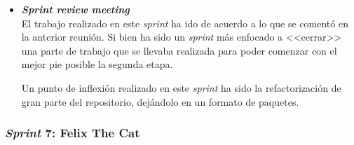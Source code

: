 \begin{itemize}
\item \textbf{\textit{Sprint review meeting}}\\
El trabajo realizado en este \textit{sprint} ha ido de acuerdo a lo que se comentó en la anterior reunión. Si bien ha sido un \textit{sprint} más enfocado a <<cerrar>> una parte de trabajo que se llevaba realizada para poder comenzar con el mejor pie posible la segunda etapa.

Un punto de inflexión realizado en este \textit{sprint} ha sido la refactorización de gran parte del repositorio, dejándolo en un formato de paquetes.
\end{itemize}

\subsubsection{\textit{Sprint} 7: Felix The Cat}
